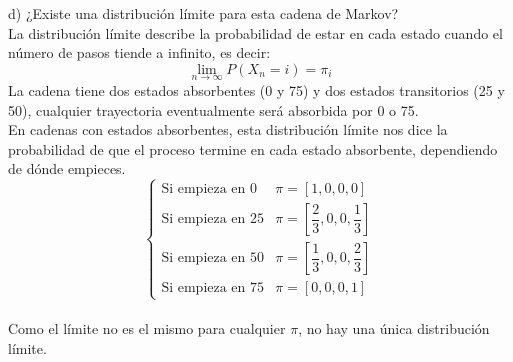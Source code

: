 \documentclass[a4paper, 12pt]{article}
\newcommand{\Aspace}{0.2cm}
\begin{document}
\begin{enumerate}
            \newpage
            \vspace{\Aspace} \par
            d) ¿Existe una distribución límite para esta cadena de Markov?
            \\ { \color{azul} 
                La distribución límite describe la probabilidad de estar en cada estado cuando el número de pasos tiende a infinito, es decir:
                \[
                    \lim_{n \rightarrow \infty} P(X_{n} = i) = \pi_{i}
                \]
                La cadena tiene dos estados absorbentes (0 y 75) y dos estados transitorios (25 y 50), cualquier trayectoria eventualmente será absorbida por 0 o 75. \\
                En cadenas con estados absorbentes, esta distribución límite nos dice la probabilidad de que el proceso termine en cada estado absorbente, dependiendo de dónde empieces. \\
                \[
                    \begin{cases}
                        \text{Si empieza en 0}      &   \pi = [1, 0, 0, 0]                                      \\
                        \text{Si empieza en 25}     &   \pi = \left[ \dfrac{2}{3}, 0, 0, \dfrac{1}{3} \right]   \\
                        \text{Si empieza en 50}     &   \pi = \left[ \dfrac{1}{3}, 0, 0, \dfrac{2}{3} \right]   \\
                        \text{Si empieza en 75}     &   \pi = [0, 0, 0, 1] 
                    \end{cases}
                \] \\
                Como el límite no es el mismo para cualquier $\pi$, no hay una única distribución límite.
            }
    \end{enumerate}
\end{document}
